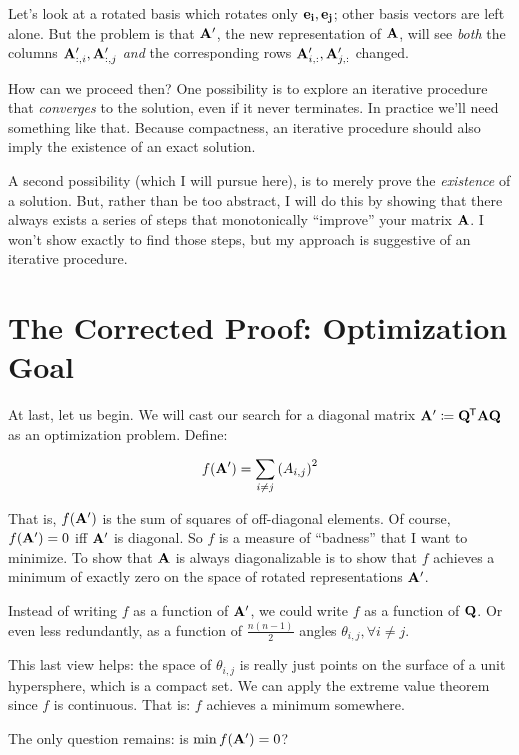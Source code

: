 \documentclass[11pt, oneside]{amsart}
\begin{document}
Let's look at a rotated basis which rotates only $\mathbf{e}_{\mathbf{i}}, \mathbf{e}_{\mathbf{j}}$;
other basis vectors are left alone. But the problem is that $\mathbf{A}'$,
the new representation of $\mathbf{A}$, will see
\textit{both} the columns $\mathbf{A}'_{:, i}, \mathbf{A}'_{:, j}$ \textit{and}
the corresponding rows $\mathbf{A}'_{i, :}, \mathbf{A}'_{j, :}$ changed.

How can we proceed then? One possibility is to explore an iterative
procedure that \textit{converges} to the solution, even if it never
terminates. In practice we'll need something like that. Because
compactness, an iterative procedure should also imply the existence of
an exact solution.

A second possibility (which I will pursue here), is to merely prove the
\textit{existence} of a solution. But, rather than be too abstract, I
will do this by showing that there always exists a series of steps that
monotonically ``improve'' your matrix $\mathbf{A}$. I won't show exactly to
find those steps, but my approach is suggestive of an iterative
procedure.

\section{The Corrected Proof: Optimization Goal}

At last, let us begin. We will cast our search for a diagonal matrix
$\mathbf{A}' \coloneqq \mathbf{Q}^{\mkern-1.5mu\mathsf{T}} \mathbf{A} \mathbf{Q}$ as an optimization problem.
Define:

\[
  f(\mathbf{A}') = \sum_{i \ne j} \left(A_{i, j}\right)^2
\]

That is, $f(\mathbf{A}')$ is the sum of squares of off-diagonal elements. Of
course, $f(\mathbf{A}') = 0$ iff $\mathbf{A}'$ is diagonal. So $f$ is a measure of
``badness'' that I want to minimize. To show that $\mathbf{A}$ is always
diagonalizable is to show that $f$ achieves a minimum of exactly zero on
the space of rotated representations $\mathbf{A}'$.

Instead of writing $f$ as a function of $\mathbf{A}'$, we could write $f$ as
a function of $\mathbf{Q}$. Or even less redundantly, as a function of
$\frac{n(n-1)}{2}$ angles $\theta_{i, j}, \forall i \ne j$.

This last view helps: the space of $\theta_{i, j}$ is really just points
on the surface of a unit hypersphere, which is a compact set. We can
apply the extreme value theorem since $f$ is continuous. That is: $f$
achieves a minimum somewhere.

The only question remains: is $\min f(\mathbf{A}') = 0$?
\end{document}
